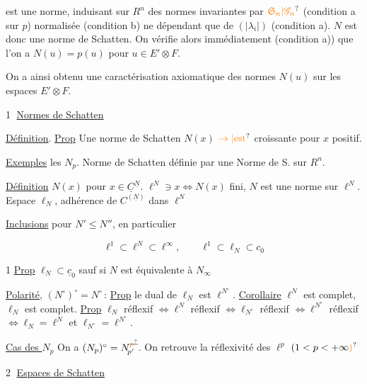 est une norme, induisant sur $R^n$ des normes  invariantes par $\unsure{\mathfrak S_n|\mathscr G_n}$ (condition a sur $p$) normalisée (condition b) ne dépendant que de $(|\lambda_i|)$ (condition a).  $N$ est donc une norme de Schatten. On vérifie alors immédiatement (condition a)) que l'on a $N(u)=p(u)$ pour  $u\in E'\otimes F$.

On a ainsi obtenu une caractérisation axiomatique des normes $N(u)$ sur les espaces  $E'\otimes F$.


\textcircled{1} \uline{Normes de Schatten}

\uline{Définition}. \uline{Prop} Une norme de Schatten $N(x)$ $\unsure{\to|\text{est}}$ croissante pour $x$ positif. 

\uline{Exemples} les $N_p$. Norme de Schatten définie par une Norme de S. sur $R^n$.

\uline{Définition} $N(x)$ pour $x\in\underline C^{\underline N}$. $\ell^N\ni x\Longleftrightarrow N(x)$ fini, $N$ est une norme sur $\ell^N$. Espace $\ell_N$, adhérence de $C^{(\underline N)}$ dans $\ell^N$

\uline{Inclusions} pour $N'\leq N''$, en particulier

\[
\ell^1\subset\ell^N\subset\ell^\infty,\qquad \ell^1\subset\ell_N\subset c_0
\]

1 \uline{Prop} $\ell_N\subset\underline c_0$ sauf si $N$ est équivalente à $N_\infty$

\uline{Polarité}, $(N^\circ)^\circ=N^\circ$\,: \uline{Prop} le dual de $\ell_N$ est $\ell^{N^\circ}$. \uline{Corollaire} $\ell^N$ est complet, $\ell_N$ est complet. \uline{Prop} $\ell_N$ réflexif $\Longleftrightarrow\ell^N$ réflexif $\Longleftrightarrow\ell_{N^\circ}$ réflexif $\Longleftrightarrow\ell^{N^\circ}$ réflexif $\Longleftrightarrow\ell_N=\ell^N$ et $\ell_{N^\circ}=\ell^{N^\circ}$.

 \uline{Cas des $N_p$} On a $(N_p)^\circ=N_{\!p'}^{\deleted{\unsure{p}}}$. On retrouve la réflexivité des $\ell^p$ $(1<p<+\infty\unsure{)}$

\textcircled{2} \uline{Espaces de Schatten}


